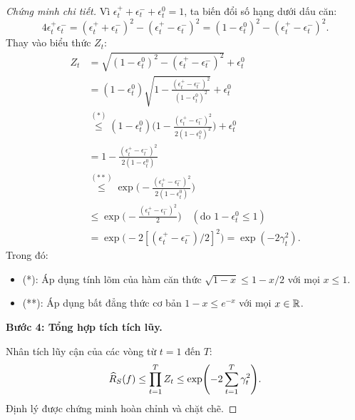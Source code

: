 \begin{proof}[Chứng minh chi tiết]
Vì $\epsilon^+_t + \epsilon^-_t + \epsilon^0_t = 1$, ta biến đổi số hạng dưới dấu căn:
\[
    4\epsilon^+_t \epsilon^-_t = (\epsilon^+_t + \epsilon^-_t)^2 - (\epsilon^+_t - \epsilon^-_t)^2
    = (1 - \epsilon^0_t)^2 - (\epsilon^+_t - \epsilon^-_t)^2.
\]
Thay vào biểu thức $Z_t$:
\begin{align*}
    Z_t &= \sqrt{(1 - \epsilon^0_t)^2 - (\epsilon^+_t - \epsilon^-_t)^2} + \epsilon^0_t \\
    &= (1 - \epsilon^0_t)\sqrt{1 - \frac{(\epsilon^+_t - \epsilon^-_t)^2}{(1 - \epsilon^0_t)^2}} + \epsilon^0_t \\
    &\stackrel{(*)}{\leq} (1 - \epsilon^0_t)\biggl(1 - \frac{(\epsilon^+_t - \epsilon^-_t)^2}{2(1 - \epsilon^0_t)^2}\biggr) + \epsilon^0_t \\
    &= 1 - \frac{(\epsilon^+_t - \epsilon^-_t)^2}{2(1 - \epsilon^0_t)} \\
    &\stackrel{(**)}{\leq} \exp\biggl(-\frac{(\epsilon^+_t - \epsilon^-_t)^2}{2(1 - \epsilon^0_t)}\biggr) \\
    &\leq \exp\biggl(-\frac{(\epsilon^+_t - \epsilon^-_t)^2}{2}\biggr) \quad (\text{do } 1 - \epsilon^0_t \leq 1) \\
    &= \exp\bigl(-2[(\epsilon^+_t - \epsilon^-_t)/2]^2\bigr) = \exp(-2\gamma_t^2).
\end{align*}
Trong đó:
\begin{itemize}
    \item (*): Áp dụng tính lõm của hàm căn thức $\sqrt{1 - x} \leq 1 - x/2$ với mọi $x \le 1$.
    \item (**): Áp dụng bất đẳng thức cơ bản $1 - x \leq e^{-x}$ với mọi $x \in \mathbb{R}$.
\end{itemize}

\textbf{Bước 4: Tổng hợp tích tích lũy.}

Nhân tích lũy cận của các vòng từ $t = 1$ đến $T$:
\[
    \widehat{R}_S(f) \leq \prod_{t=1}^T Z_t \leq \exp\Biggl(-2 \sum_{t=1}^T \gamma_t^2\Biggr).
\]
Định lý được chứng minh hoàn chỉnh và chặt chẽ.
\end{proof}

